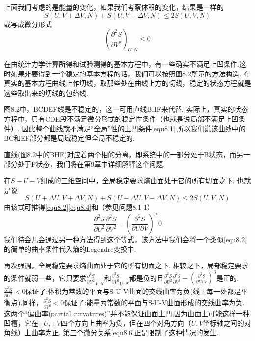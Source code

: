 上面我们考虑的是能量的变化，如果我们考察体积的变化，结果是一样的
\begin{equation}
\label{equ8.3}
S(U,V+\Delta　V,N)+S(U,V-\Delta V,N)\leq 2S(U,V,N)
\end{equation}
或写成微分形式
\begin{equation}
\label{equ8.4}
\left(\frac{\partial^2S}{\partial V^2}\right)_{U,N}\leq 0
\end{equation}

在由统计力学计算所得和试验测得的基本方程中，有一些确实不满足上凹条件.这时如果非要得到一个稳定的基本方程的话，我们可以按照图8.2所示的方法构造. 在真实的基本方程曲线上作切线，取那些处在曲线上方的切线，\textsf{稳定的状态方程就是这些取出来的切线的包络线}.

图8.2中，BCDEF线是不稳定的，这一可用直线BHF来代替. 实际上，真实的状态方程中，只有CDE段不满足微分形式的稳定性条件（也就是说局部不满足上凹条件）. 因此整个曲线就不满足“全局”性的上凹条件\ref{equ8.1}.所以我们说该曲线中的BC和EF部分都是局域稳定但全局不稳定的.

直线(图8.2中的BHF)对应着两个相的分离，即系统中的一部分处于B状态，而另一部分处于F状态，我们将在第9章中详细解释这个问题.

在$S-U-V$组成的三维空间中，全局稳定要求熵曲面处于它的所有切面之下. 也就是说
\begin{equation}
\label{equ8.5}
S(U+\Delta　U,V+\Delta　V,N)+S(U-\Delta　U,V-\Delta V,N)\leq 2S(U,V,N)
\end{equation}
由该式可推得\ref{equ8.2}\ref{equ8.4}和（参见问题8.1-1）
\begin{equation}
\label{equ8.6}
\frac{\partial^2S}{\partial U^2}\frac{\partial^2S}{\partial V^2}-\left(\frac{\partial^2S}{\partial U\partial V}\right)^\ge 0
\end{equation}
我们待会儿会通过另一种方法得到这个等式，该方法中我们会将一个类似\ref{equ8.2}的简单的曲率条件代入熵的Legendre变换中.

再次强调，全局稳定要求熵曲面处于它的所有切面之下. 相较之下，局部稳定要求的条件就弱一些，它只要求$\frac{\partial^2S}{\partial U^2}_{V,N}$和$\frac{\partial^2S}{\partial V^2}_{U,N}$都是负的且$\frac{\partial^2S}{\partial U^2}\frac{\partial^2S}{\partial V^2}-\left(\frac{\partial^2S}{\partial U\partial V}\right)^3$是正的.
$\frac{\partial^2S}{\partial U^2}<0$保证了:体积为常数的平面与S-U-V曲面的交线曲率为负(线上每一处都是平衡点).同样，$\frac{\partial^2S}{\partial V^2}<0$保证了:能量为常数的平面与S-U-V曲面形成的交线曲率为负.
这两个“偏曲率(partial curvatures)”并不能保证曲面上凹,因为曲面上可能这样一种凹槽，它在$\pm U, \pm V$四个方向上曲率为负，但在四个对角方向（$U,V$坐标轴之间的对角线）上曲率为正. 第三个微分关系\ref{equ8.6}正是限制了这种情况的发生.

